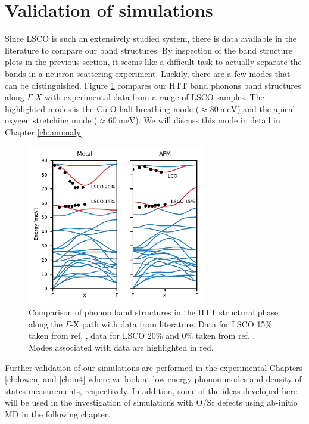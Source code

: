 \section{Validation of simulations}\label{sec:sim_validation}
Since LSCO is such an extensively studied system, there is data available in the literature to compare our band structures. By inspection of the band structure plots in the previous section, it seems like a difficult task to actually separate the bands in a neutron scattering experiment. Luckily, there are a few modes that can be distinguished. Figure \ref{fig:htt_phonons_lit} compares our HTT band phonons band structures along $\Gamma$-$X$ with experimental data from a range of LSCO samples. The highlighted modes is the Cu-O half-breathing mode ($\approx \SI{80}{\milli\eV}$) and the apical oxygen stretching mode ($\approx \SI{60}{\milli\eV}$). We will discuss this mode in detail in Chapter \ref{ch:anomaly}

\begin{figure}
	\centering
	\includegraphics[width=0.7\textwidth]{fig/simulation/htt_phonons_lit.pdf}
	\caption[phonon bands: comparison with literature]{Comparison of phonon band structures in the HTT structural phase along the $\Gamma$-X path with data from literature. Data for LSCO 15\% taken from ref. \cite{McQueeney1999}, data for LSCO 20\% and 0\% taken from ref. \cite{Park2014}. Modes associated with data are highlighted in red.}
	\label{fig:htt_phonons_lit}
\end{figure}

Further validation of our simulations are performed in the experimental Chapters \ref{ch:lowen} and \ref{ch:in4} where we look at low-energy phonon modes and density-of-states measurements, respectively. In addition, some of the ideas developed here will be used in the investigation of simulations with O/Sr defects using ab-initio MD in the following chapter.

